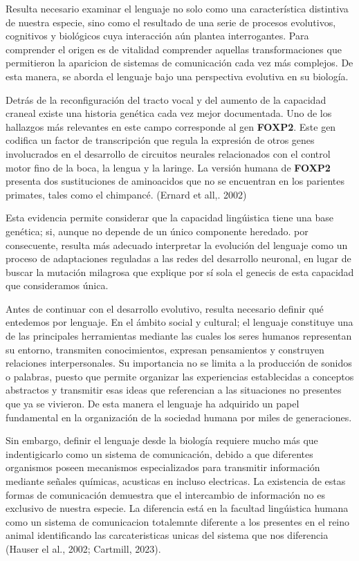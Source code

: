 \documentclass[12pt]{article}
\begin{document}
Resulta necesario examinar el lenguaje no solo como una característica distintiva de nuestra especie, sino como el resultado de una serie de procesos evolutivos, cognitivos y biológicos cuya interacción aún plantea interrogantes. Para comprender el origen es de vitalidad comprender aquellas transformaciones que permitieron la aparicion de sistemas de comunicación cada vez más complejos. De esta manera, se aborda el lenguaje bajo una perspectiva evolutiva en su biología.

Detrás de la reconfiguración del tracto vocal y del aumento de la capacidad craneal existe una historia genética cada vez mejor documentada. Uno de los hallazgos más relevantes en este campo corresponde al gen \textbf{FOXP2}. Este gen codifica un factor de transcripción que regula la expresión de otros genes involucrados en el desarrollo de circuitos neurales relacionados con el control motor fino de la boca, la lengua y la laringe. La versión humana de \textbf{FOXP2} presenta dos sustituciones de aminoacidos que no se encuentran en los parientes primates, tales como el chimpancé. (Ernard et all,. 2002)

Esta evidencia permite considerar que la capacidad lingúistica tiene una base genética; si, aunque no depende de un único componente heredado. por consecuente, resulta más adecuado interpretar la evolución del lenguaje como un proceso de adaptaciones reguladas a las redes del desarrollo neuronal, en lugar de buscar la mutación milagrosa que explique por sí sola el genecis de esta capacidad que consideramos única.

Antes de continuar con el desarrollo evolutivo, resulta necesario definir qué entedemos por lenguaje. En el ámbito social y cultural; el lenguaje constituye una de las principales herramientas mediante las cuales los seres humanos representan su entorno, transmiten conocimientos, expresan pensamientos y construyen relaciones interpersonales. Su importancia no se limita a la producción de sonidos o palabras, puesto que permite organizar las experiencias establecidas a conceptos abstractos y transmitir esas ideas que referencian a las situaciones no presentes que ya se vivieron. De esta manera el lenguaje ha adquirido un papel fundamental en la organización de la sociedad humana por miles de generaciones.

Sin embargo, definir el lenguaje desde la biología requiere mucho más que indentigicarlo como un sistema de comunicación, debido a que diferentes organismos poseen mecanismos especializados para transmitir información mediante señales químicas, acusticas en incluso electricas. La existencia de estas formas de comunicación demuestra que el intercambio de información no es exclusivo de nuestra especie. La diferencia está en la facultad lingúistica humana como un sistema de comunicacion totalemnte diferente a los presentes en el reino animal identificando las carcateristicas unicas del sistema que nos diferencia (Hauser el al., 2002; Cartmill, 2023).
\end{document}
